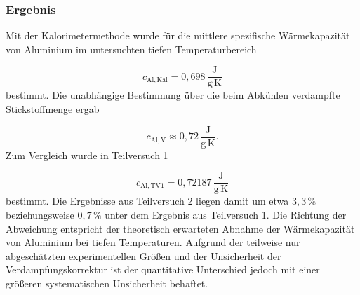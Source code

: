\documentclass{report}
\begin{document}
\subsubsection{Ergebnis}
\noindent
Mit der Kalorimetermethode wurde für die mittlere spezifische Wärmekapazität von
Aluminium im untersuchten tiefen Temperaturbereich

\begin{equation}
\boxed{
c_\mathrm{Al,Kal}
=
0{,}698\,\frac{\mathrm{J}}{\mathrm{g\,K}}
}
\end{equation}
\noindent
bestimmt.
\noindent
Die unabhängige Bestimmung über die beim Abkühlen verdampfte Stickstoffmenge
ergab

\begin{equation}
\boxed{
c_\mathrm{Al,V}
\approx
0{,}72\,\frac{\mathrm{J}}{\mathrm{g\,K}}
}.
\end{equation}
\noindent
Zum Vergleich wurde in Teilversuch 1

\begin{equation}
c_\mathrm{Al,TV1}
=
0{,}72187\,\frac{\mathrm{J}}{\mathrm{g\,K}}
\end{equation}
\noindent
bestimmt.
\noindent
Die Ergebnisse aus Teilversuch 2 liegen damit um etwa $3{,}3\,\%$
beziehungsweise $0{,}7\,\%$ unter dem Ergebnis aus Teilversuch 1. Die Richtung
der Abweichung entspricht der theoretisch erwarteten Abnahme der
Wärmekapazität von Aluminium bei tiefen Temperaturen. Aufgrund der teilweise
nur abgeschätzten experimentellen Größen und der Unsicherheit der
Verdampfungskorrektur ist der quantitative Unterschied jedoch mit einer
größeren systematischen Unsicherheit behaftet.


\newpage
\end{document}
